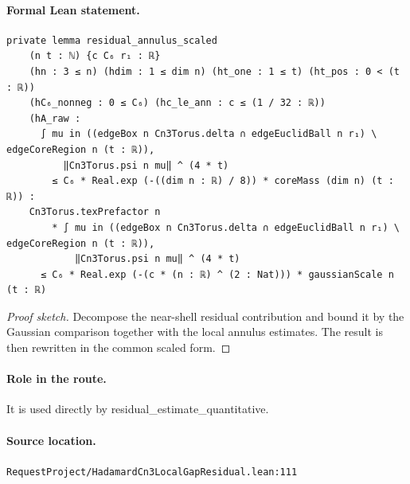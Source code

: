 \medskip
\paragraph{Formal Lean statement.}
\begin{verbatim}
private lemma residual_annulus_scaled
    (n t : ℕ) {c C₆ r₁ : ℝ}
    (hn : 3 ≤ n) (hdim : 1 ≤ dim n) (ht_one : 1 ≤ t) (ht_pos : 0 < (t : ℝ))
    (hC₆_nonneg : 0 ≤ C₆) (hc_le_ann : c ≤ (1 / 32 : ℝ))
    (hA_raw :
      ∫ mu in ((edgeBox n Cn3Torus.delta ∩ edgeEuclidBall n r₁) \ edgeCoreRegion n (t : ℝ)),
          ‖Cn3Torus.psi n mu‖ ^ (4 * t)
        ≤ C₆ * Real.exp (-((dim n : ℝ) / 8)) * coreMass (dim n) (t : ℝ)) :
    Cn3Torus.texPrefactor n
        * ∫ mu in ((edgeBox n Cn3Torus.delta ∩ edgeEuclidBall n r₁) \ edgeCoreRegion n (t : ℝ)),
            ‖Cn3Torus.psi n mu‖ ^ (4 * t)
      ≤ C₆ * Real.exp (-(c * (n : ℝ) ^ (2 : Nat))) * gaussianScale n (t : ℝ)
\end{verbatim}
\begin{proof}[Proof sketch]
Decompose the near-shell residual contribution and bound it by the Gaussian comparison together with the local annulus estimates. The result is then rewritten in the common scaled form.
\end{proof}
\paragraph{Role in the route.}
It is used directly by residual\_estimate\_quantitative.
\paragraph{Source location.}
\texttt{RequestProject/HadamardCn3LocalGapResidual.lean:111}
\medskip
